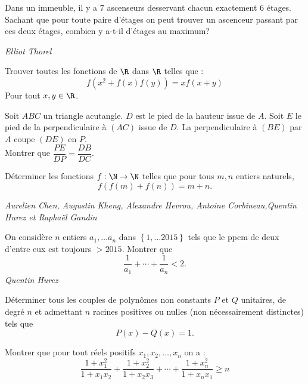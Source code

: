 \begin{exo}{}
Dans un immeuble, il y a $7$ ascenseurs desservant chacun exactement $6$ étages. Sachant que pour toute paire d'étages on peut trouver un ascenceur passant par ces deux étages, combien y a-t-il d'étages au maximum?

\medskip
\textit{Elliot Thorel}

\end{exo}



\begin{exo}{}
Trouver toutes les fonctions de $\R$ dans $\R$ telles que :
$$f(x^2+f(x)f(y))=xf(x+y)$$
Pour tout $x,y\in \R$.
\end{exo}



\begin{exo}{}
Soit $ABC$ un triangle acutangle. $D$ est le pied de la hauteur issue de $A$. Soit $E$ le
pied de la perpendiculaire à $(AC)$ issue de $D$. La perpendiculaire à $(BE)$ par $A$ coupe $(DE)$ en $P$. \\
Montrer que $\dfrac{PE}{DP}=\dfrac{DB}{DC}$.
\end{exo}


\begin{exo}{}
Déterminer les fonctions $f : \N \rightarrow \N$ telles que pour tous $m,n$ entiers naturels, $$f(f(m)+f(n))=m+n.$$

\medskip
\textit{Aurelien Chen, Augustin Kheng, Alexandre Hevrou, Antoine Corbineau,Quentin Hurez et Raphaël Gandin}

\end{exo}

\begin{exo}{}
On considère $n$ entiers $a_{1},\ldots a_{n}$
dans $\left\{ 1,\ldots2015\right\} $ tels que le ppcm de deux d'entre
eux est toujours $>2015$. Montrer que
\[
\frac{1}{a_{1}}+\cdots+\frac{1}{a_{n}}<2.
\]
\medskip
\textit{Quentin Hurez}

\end{exo}

\begin{exo}{}Déterminer tous les couples de polynômes non constants $P$ et $Q$ unitaires, de degré $n$ et admettant $n$ racines positives ou nulles (non nécessairement distinctes) tels que
$$P(x) - Q(x) = 1.$$
\end{exo}

\begin{exo}{}
Montrer que pour tout réels positifs $x_1,x_2,\dots,x_n$ on a :
$$\frac{1+x_{1}^2}{1+x_{1}x_{2}}+\frac{1+x_{2}^2}{1+x_{2}x_{3}}+\cdots+\frac{1+x_{n}^2}{1+x_{n}x_{1}}\geq n$$
\end{exo}

